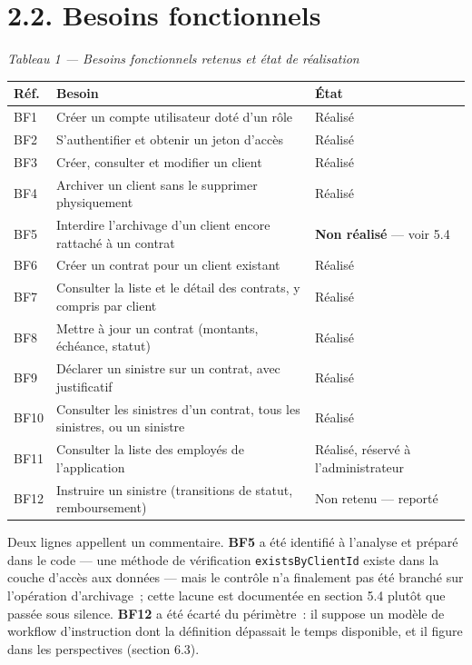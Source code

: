 \documentclass[12pt,a4paper]{report}
\begin{document}
\section*{2.2. Besoins fonctionnels}
\begin{center}\textit{Tableau 1 — Besoins fonctionnels retenus et état de réalisation}\end{center}
{\small
\begin{tabularx}{\linewidth}{|X|X|X|}
\hline
\textbf{Réf.} & \textbf{Besoin} & \textbf{État} \\ \hline
BF1 & Créer un compte utilisateur doté d'un rôle & Réalisé \\ \hline
BF2 & S'authentifier et obtenir un jeton d'accès & Réalisé \\ \hline
BF3 & Créer, consulter et modifier un client & Réalisé \\ \hline
BF4 & Archiver un client sans le supprimer physiquement & Réalisé \\ \hline
BF5 & Interdire l'archivage d'un client encore rattaché à un contrat & \textbf{Non réalisé} — voir 5.4 \\ \hline
BF6 & Créer un contrat pour un client existant & Réalisé \\ \hline
BF7 & Consulter la liste et le détail des contrats, y compris par client & Réalisé \\ \hline
BF8 & Mettre à jour un contrat (montants, échéance, statut) & Réalisé \\ \hline
BF9 & Déclarer un sinistre sur un contrat, avec justificatif & Réalisé \\ \hline
BF10 & Consulter les sinistres d'un contrat, tous les sinistres, ou un sinistre & Réalisé \\ \hline
BF11 & Consulter la liste des employés de l'application & Réalisé, réservé à l'administrateur \\ \hline
BF12 & Instruire un sinistre (transitions de statut, remboursement) & Non retenu — reporté \\ \hline
\end{tabularx}

}
Deux lignes appellent un commentaire. \textbf{BF5} a été identifié à l'analyse et préparé dans le code — une méthode de vérification \texttt{existsByClientId} existe dans la couche d'accès aux données — mais le contrôle n'a finalement pas été branché sur l'opération d'archivage~; cette lacune est documentée en section 5.4 plutôt que passée sous silence. \textbf{BF12} a été écarté du périmètre~: il suppose un modèle de workflow d'instruction dont la définition dépassait le temps disponible, et il figure dans les perspectives (section 6.3).
\end{document}
